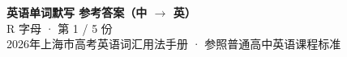 \documentclass[10pt,a4paper]{article}
\begin{document}
\pagestyle{plain}

\begin{center}
{\LARGE\bfseries 英语单词默写 \quad 参考答案（中 $\to$ 英）}\\[0.22em]
{\large R 字母 · 第 1 / 5 份}\\[0.18em]
{\small 2026年上海市高考英语词汇用法手册 · 参照普通高中英语课程标准}
\end{center}

\vspace{0.2em}
\noindent{\color{rulegray}\rule{\textwidth}{0.8pt}}

\vspace{0.35em}

\vspace{0.25em}
\renewcommand{\arraystretch}{1.32}
\end{document}

